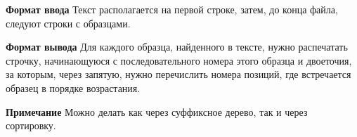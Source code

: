

\textbf{Формат ввода}
Текст располагается на первой строке, затем, до конца файла, следуют строки с образцами.

\textbf{Формат вывода}
Для каждого образца, найденного в тексте, нужно распечатать строчку, начинающуюся с последовательного номера этого образца и двоеточия, за которым, через запятую, нужно перечислить номера позиций, где встречается образец в порядке возрастания.

\textbf{Примечание}
Можно делать как через суффиксное дерево, так и через сортировку.

\pagebreak